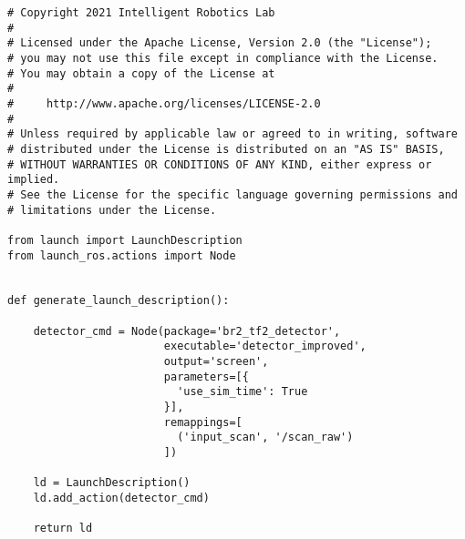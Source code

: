  \footnotesize
\begin{tcolorbox}[sharp corners, colframe=gray!80, colback=LightGray, left=0pt, top=0pt, bottom=0pt, title=\texttt{br2\_tf2\_detector/launch/detector\_improved.launch.py}]
  \begin{verbatim}
# Copyright 2021 Intelligent Robotics Lab
#
# Licensed under the Apache License, Version 2.0 (the "License");
# you may not use this file except in compliance with the License.
# You may obtain a copy of the License at
#
#     http://www.apache.org/licenses/LICENSE-2.0
#
# Unless required by applicable law or agreed to in writing, software
# distributed under the License is distributed on an "AS IS" BASIS,
# WITHOUT WARRANTIES OR CONDITIONS OF ANY KIND, either express or implied.
# See the License for the specific language governing permissions and
# limitations under the License.

from launch import LaunchDescription
from launch_ros.actions import Node


def generate_launch_description():

    detector_cmd = Node(package='br2_tf2_detector',
                        executable='detector_improved',
                        output='screen',
                        parameters=[{
                          'use_sim_time': True
                        }],
                        remappings=[
                          ('input_scan', '/scan_raw')
                        ])

    ld = LaunchDescription()
    ld.add_action(detector_cmd)

    return ld
    \end{verbatim}
    \end{tcolorbox}
  \normalsize

